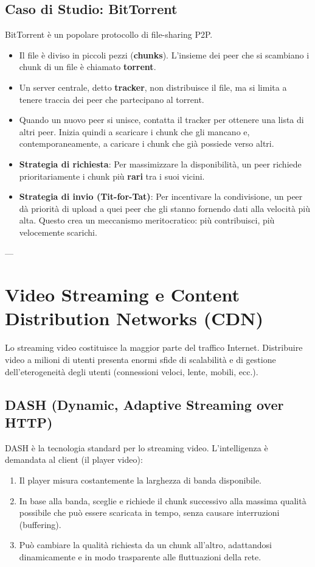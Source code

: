 \subsection{Caso di Studio: BitTorrent}
BitTorrent è un popolare protocollo di file-sharing P2P.
\begin{itemize}
    \item Il file è diviso in piccoli pezzi (\textbf{chunks}). L'insieme dei peer che si scambiano i chunk di un file è chiamato \textbf{torrent}.
    \item Un server centrale, detto \textbf{tracker}, non distribuisce il file, ma si limita a tenere traccia dei peer che partecipano al torrent.
    \item Quando un nuovo peer si unisce, contatta il tracker per ottenere una lista di altri peer. Inizia quindi a scaricare i chunk che gli mancano e, contemporaneamente, a caricare i chunk che già possiede verso altri.
    \item \textbf{Strategia di richiesta}: Per massimizzare la disponibilità, un peer richiede prioritariamente i chunk più \textbf{rari} tra i suoi vicini.
    \item \textbf{Strategia di invio (Tit-for-Tat)}: Per incentivare la condivisione, un peer dà priorità di upload a quei peer che gli stanno fornendo dati alla velocità più alta. Questo crea un meccanismo meritocratico: più contribuisci, più velocemente scarichi.
\end{itemize}

---

\section{Video Streaming e Content Distribution Networks (CDN)}
Lo streaming video costituisce la maggior parte del traffico Internet. Distribuire video a milioni di utenti presenta enormi sfide di scalabilità e di gestione dell'eterogeneità degli utenti (connessioni veloci, lente, mobili, ecc.).

\subsection{DASH (Dynamic, Adaptive Streaming over HTTP)}
DASH è la tecnologia standard per lo streaming video.
L'intelligenza è demandata al client (il player video):
\begin{enumerate}
    \item Il player misura costantemente la larghezza di banda disponibile.
    \item In base alla banda, sceglie e richiede il chunk successivo alla massima qualità possibile che può essere scaricata in tempo, senza causare interruzioni (buffering).
    \item Può cambiare la qualità richiesta da un chunk all'altro, adattandosi dinamicamente e in modo trasparente alle fluttuazioni della rete.
\end{enumerate}

